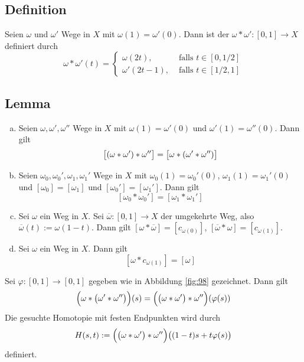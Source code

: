 \subsection[Definition: Kompositionsweg]{Definition} %
\label{sub:97}
Seien $\omega$ und $\omega'$ Wege in $X$ mit $\omega(1)= \omega'(0)$. Dann ist der  $\omega * \omega' : [0,1] \to X$ definiert durch 
\[
	\omega * \omega' (t) = \begin{cases}
		\omega(2 t), &\text{ falls }t \in [0, 1/2]\\
		\omega'(2t -1), &\text{ falls } t \in [1/2,1]
	\end{cases}
\] 
\subsection[Lemma: Eigenschaften des Kompositionsweg als Verknüpfung]{Lemma} %
\label{sub:98}
\begin{enumerate}[a)]
	\item Seien $\omega, \omega', \omega''$ Wege in $X$ mit $\omega(1)= \omega'(0)$ und $\omega'(1)= \omega''(0)$. Dann gilt 
	\[
		\benbrace[\big]{(\omega * \omega') * \omega''} =  \benbrace[\big]{\omega * ( \omega' * \omega'')}
	\]
	\item Seien $\omega_0, \omega_0', \omega_1, \omega_1'$ Wege in $X$ mit $\omega_0(1)= \omega_0'(0)$, $\omega_1(1)= \omega_1'(0)$ und 
	$[\omega_0] = [\omega_1]$ und $[\omega_0'] = [\omega_1']$. Dann gilt
	\[
		[\omega_0 * \omega_0'] = [\omega_1 * \omega_1']
	\]
	\item Sei $\omega$ ein Weg in $X$. Sei $\overline{\omega} : [0,1] \to X $ der umgekehrte Weg, also $\overline{\omega} (t) := \omega(1-t)$. Dann gilt 
	$[\omega * \overline{\omega}] = [c_{\omega(0)}]$, $[\overline{\omega} * \omega ] = [c_{\omega(1)}]$.
	\item Sei $\omega$ ein Weg in $X$. Dann gilt 
	\[
		[\omega * c_{\omega(1)}] = [\omega]
	\]
\end{enumerate}
\begin{minipage}[t]{0.6\textwidth}
	Sei $\varphi : [0,1] \to [0,1]$ gegeben wie in Abbildung \ref{fig:98} gezeichnet.
	Dann gilt 
	\begin{align*}
		\enbrace[\Big]{\omega * \enbrace[\big]{\omega' * \omega''} }(s) = \enbrace[\Big]{\enbrace[\big]{\omega * \omega'} * \omega''} (\varphi(s))  
	\end{align*}
	Die gesuchte Homotopie mit festen Endpunkten wird durch
	\[
		H(s,t) := \enbrace[\Big]{ \enbrace[\big]{\omega * \omega'} * \omega'' } \enbrace[\big]{(1-t)s + t \varphi(s)}  
	\]
	definiert. \bewende
\end{minipage}
